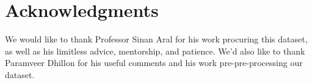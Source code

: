 \documentclass[fleqn,12pt]{SelfArx} %
\begin{document}
\section*{Acknowledgments} %

We would like to thank Professor Sinan Aral for his work procuring this dataset, as well as his limitless advice, mentorship, and patience. We'd also like to thank Paramveer Dhillon for his useful comments and his work pre-pre-processing our dataset.





\end{document}
